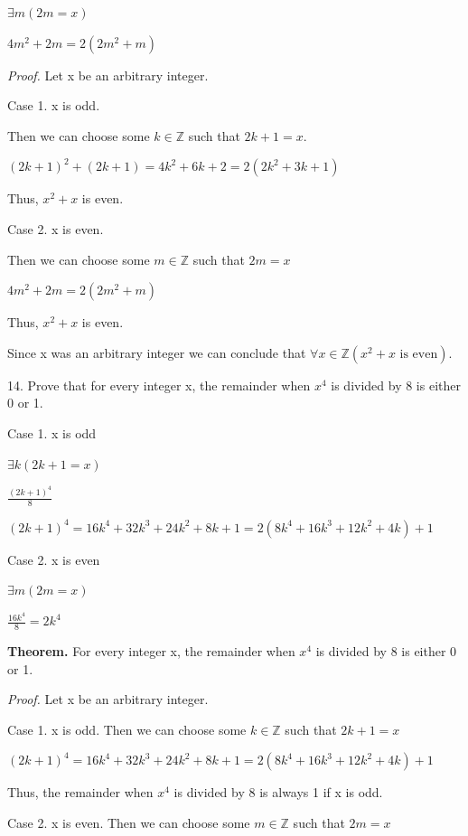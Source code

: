 \documentclass{article}
\begin{document}
$\exists m (2m = x)$

$4m^2 + 2m = 2(2m^2 + m)$
\vspace{20pt}

\textit{Proof.} Let x be an arbitrary integer.

Case 1. x is odd.

Then we can choose some $k \in \mathbb{Z}$ such that $2k + 1 = x$.

$(2k + 1)^2 + (2k + 1) = 4k^2 + 6k + 2 = 2(2k^2 + 3k + 1)$

Thus, $x^2 + x$ is even.

Case 2. x is even.

Then we can choose some $m \in \mathbb{Z}$ such that $2m = x$

$4m^2 + 2m = 2(2m^2 + m)$

Thus, $x^2 + x$ is even.

Since x was an arbitrary integer we can conclude that $\forall x \in \mathbb{Z} (x^2 + x \text{ is even})$.

\vspace{30pt}

14. Prove that for every integer x, the remainder when $x^4$ is divided by 8 is either 0 or 1.

\vspace{30pt}

Case 1. x is odd

$\exists k (2k + 1 = x)$

$\frac{(2k + 1)^4}{8}$

$(2k+1)^4 = 16k^4 + 32k^3 + 24k^2 + 8k + 1 = 2(8k^4 + 16k^3 + 12k^2 + 4k) + 1$

Case 2. x is even

$\exists m (2m = x)$

$\frac{16k^4}{8} = 2k^4$
\vspace{20pt}

\textbf{Theorem.} For every integer x, the remainder when $x^4$ is divided by 8 is either 0 or 1.

\textit{Proof.} Let x be an arbitrary integer.

Case 1. x is odd. Then we can choose some $k \in \mathbb{Z}$ such that $2k + 1 = x$

$(2k+1)^4 = 16k^4 + 32k^3 + 24k^2 + 8k + 1 = 2(8k^4 + 16k^3 + 12k^2 + 4k) + 1$

Thus, the remainder when $x^4$ is divided by 8 is always 1 if x is odd.

Case 2. x is even. Then we can choose some $m \in \mathbb{Z}$ such that $2m = x$
\end{document}
